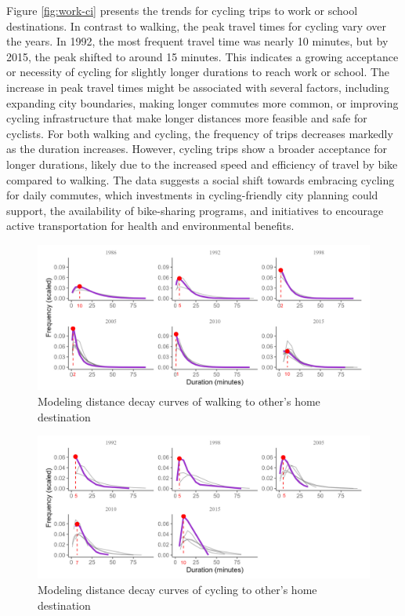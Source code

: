 \documentclass[12pt,twoside]{reedthesis}
\begin{document}
Figure \ref{fig:work-ci} presents the trends for cycling trips to work or school destinations. In contrast to walking, the peak travel times for cycling vary over the years. In 1992, the most frequent travel time was nearly 10 minutes, but by 2015, the peak shifted to around 15 minutes. This indicates a growing acceptance or necessity of cycling for slightly longer durations to reach work or school. The increase in peak travel times might be associated with several factors, including expanding city boundaries, making longer commutes more common, or improving cycling infrastructure that make longer distances more feasible and safe for cyclists. For both walking and cycling, the frequency of trips decreases markedly as the duration increases. However, cycling trips show a broader acceptance for longer durations, likely due to the increased speed and efficiency of travel by bike compared to walking. The data suggests a social shift towards embracing cycling for daily commutes, which investments in cycling-friendly city planning could support, the availability of bike-sharing programs, and initiatives to encourage active transportation for health and environmental benefits.
\begin{landscape}
\begin{figure}

{\centering \includegraphics[width=0.9\linewidth]{other-wi} 

}

\caption{Modeling distance decay curves of walking to other's home destination}\label{fig:other-wi}
\end{figure}
\begin{figure}

{\centering \includegraphics[width=0.9\linewidth]{other-ci} 

}

\caption{Modeling distance decay curves of cycling to other's home destination}\label{fig:other-ci}
\end{figure}
\end{landscape}
\end{document}
